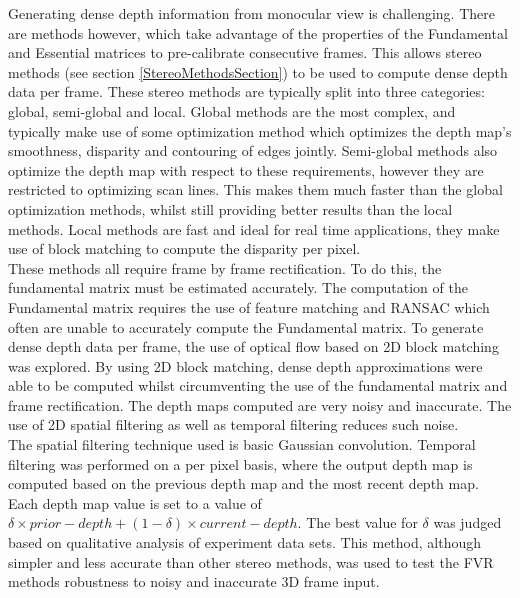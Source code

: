 Generating dense depth information from monocular view is challenging. There are methods however, which take advantage of the properties of the Fundamental and Essential matrices to pre-calibrate consecutive frames. This allows stereo methods (see section \ref{StereoMethodsSection}) to be used to compute dense depth data per frame. These stereo methods are typically split into three categories: global, semi-global and local. Global methods are the most complex, and typically make use of some optimization method which optimizes the depth map's smoothness, disparity and contouring of edges jointly. Semi-global methods also optimize the depth map with respect to these requirements, however they are restricted to optimizing scan lines. This makes them much faster than the global optimization methods, whilst still providing better results than the local methods. Local methods are fast and ideal for real time applications, they make use of block matching to compute the disparity per pixel. \\

These methods all require frame by frame rectification. To do this, the fundamental matrix must be estimated accurately. The computation of the Fundamental matrix requires the use of feature matching and RANSAC which often are unable to accurately compute the Fundamental matrix. To generate dense depth data per frame, the use of optical flow based on 2D block matching was explored. By using 2D block matching, dense depth approximations were able to be computed whilst circumventing the use of the fundamental matrix and frame rectification. The depth maps computed are very noisy and inaccurate. The use of 2D spatial filtering as well as temporal filtering reduces such noise. \\

The spatial filtering technique used is basic Gaussian convolution. Temporal filtering was performed on a per pixel basis, where the output depth map is computed based on the previous depth map and the most recent depth map. Each depth map value is set to a value of $\delta \times prior-depth + (1-\delta) \times current-depth$. The best value for $\delta$ was judged based on qualitative analysis of experiment data sets. This method, although simpler and less accurate than other stereo methods, was used to test the FVR methods robustness to noisy and inaccurate 3D frame input. \\


